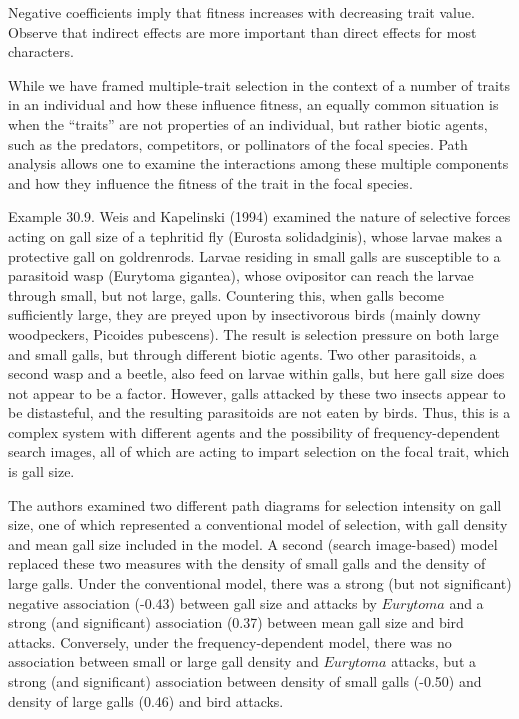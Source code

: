 \documentclass{article}
\begin{document}
Negative coefficients imply that fitness increases with decreasing trait value. Observe that indirect effects are more important than direct effects for most characters.

While we have framed multiple-trait selection in the context of a number of traits in an individual and how these influence fitness, an equally common situation is when the “traits” are not properties of an individual, but rather biotic agents, such as the predators, competitors, or pollinators of the focal species. Path analysis allows one to examine the interactions among these multiple components and how they influence the fitness of the trait in the focal species.

Example 30.9. Weis and Kapelinski (1994) examined the nature of selective forces acting on gall size of a tephritid fly (Eurosta solidadginis), whose larvae makes a protective gall on goldrenrods. Larvae residing in small galls are susceptible to a parasitoid wasp (Eurytoma gigantea), whose ovipositor can reach the larvae through small, but not large, galls. Countering this, when galls become sufficiently large, they are preyed upon by insectivorous birds (mainly downy woodpeckers, Picoides pubescens). The result is selection pressure on both large and small galls, but through different biotic agents. Two other parasitoids, a second wasp and a beetle, also feed on larvae within galls, but here gall size does not appear to be a factor. However, galls attacked by these two insects appear to be distasteful, and the resulting parasitoids are not eaten by birds. Thus, this is a complex system with different agents and the possibility of frequency-dependent search images, all of which are acting to impart selection on the focal trait, which is gall size.

The authors examined two different path diagrams for selection intensity on gall size, one of which represented a conventional model of selection, with gall density and mean gall size included in the model. A second (search image-based) model replaced these two measures with the density of small galls and the density of large galls. Under the conventional model, there was a strong (but not significant) negative association (-0.43) between gall size and attacks by  $ Eurytoma $ and a strong (and significant) association (0.37) between mean gall size and bird attacks. Conversely, under the frequency-dependent model, there was no association between small or large gall density and  $ Eurytoma $ attacks, but a strong (and significant) association between density of small galls (-0.50) and density of large galls (0.46) and bird attacks.
\end{document}
